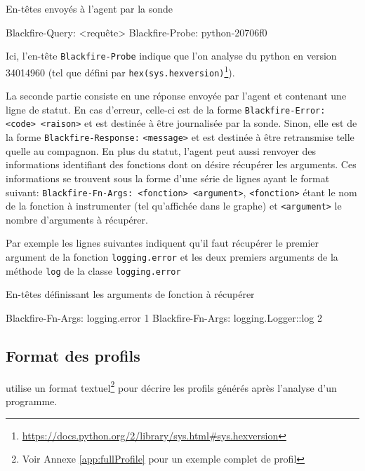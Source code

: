 \begin{listing}[H]
\caption{En-têtes envoyés à l'agent par la sonde}
\begin{textcode}
Blackfire-Query: <requête>
Blackfire-Probe: python-20706f0
\end{textcode}
\end{listing}
Ici, l'en-tête \verb|Blackfire-Probe| indique que l'on analyse du python en version 34014960 (tel que défini par \texttt{hex(sys.hexversion)}\footnote{\url{https://docs.python.org/2/library/sys.html#sys.hexversion}}).

La seconde partie consiste en une réponse envoyée par l'agent et contenant une ligne de statut. En cas d'erreur, celle-ci est de la forme \verb|Blackfire-Error: <code> <raison>| et est destinée à être journalisée par la sonde. Sinon, elle est de la forme \verb|Blackfire-Response:| \verb|<message>| et est destinée à être retransmise telle quelle au compagnon. En plus du statut, l'agent peut aussi renvoyer des informations identifiant des fonctions dont on désire récupérer les arguments. Ces informations se trouvent sous la forme d'une série de lignes ayant le format suivant: \verb|Blackfire-Fn-Args: <fonction> <argument>|,
\verb|<fonction>| étant le nom de la fonction à instrumenter (tel qu'affichée dans le graphe) et \verb|<argument>| le nombre d'arguments à récupérer.

Par exemple les lignes suivantes indiquent qu'il faut récupérer le premier argument de la fonction \verb|logging.error| et les deux premiers arguments de la méthode \verb|log| de la classe \verb|logging.error|
\begin{listing}[H]
\caption{En-têtes définissant les arguments de fonction à récupérer}
\begin{textcode}
Blackfire-Fn-Args: logging.error 1
Blackfire-Fn-Args: logging.Logger::log 2
\end{textcode}
\end{listing}
\clearpage
				\subsection{Format des profils}
\Blackfire utilise un format textuel\footnote{Voir Annexe \vref{app:fullProfile} pour un exemple complet de profil} pour décrire les profils générés après l'analyse d'un programme.

